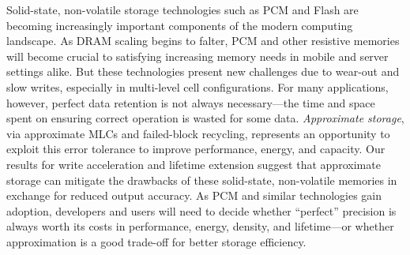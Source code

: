 \documentclass[prodmode,acmtocs]{acmsmall}
\begin{document}
Solid-state, non-volatile storage technologies such as PCM and Flash are
becoming increasingly important components of the modern computing landscape.
As DRAM scaling begins to falter, PCM and other resistive memories will become
crucial to satisfying increasing memory needs in mobile and server settings
alike. But these technologies present new challenges due to wear-out and slow
writes, especially in multi-level cell configurations. For many applications,
however, perfect data retention is not always necessary---the time and space
spent on ensuring correct operation is wasted for some data. \emph{Approximate
storage}, via approximate MLCs and failed-block recycling, represents an
opportunity to exploit this error tolerance to improve performance, energy, and
capacity. Our results for write acceleration and lifetime extension suggest
that approximate storage can mitigate the drawbacks of these solid-state,
non-volatile memories in exchange for reduced output accuracy.
As PCM and similar technologies gain adoption, developers and users will need
to decide whether ``perfect'' precision is always worth its costs in
performance, energy, density, and lifetime---or whether approximation is a
good trade-off for better storage efficiency.



\end{document}

